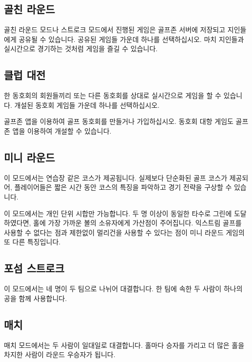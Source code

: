 \documentclass[10pt, openright, language=korean]{hzguide}
\begin{document}
\subsection{골친 라운드}

골친 라운드 모드나 스트로크 모드에서 진행된 게임은 골프존 서버에 저장되고 지인들에게 공유될 수 있습니다.
공유된 게임들 가운데 하나를 선택하십시오.
마치 지인들과 실시간으로 경기하는 것처럼 게임을 즐길 수 있습니다.

\subsection{클럽 대전}

한 동호회의 회원들끼리 또는 다른 동호회를 상대로 실시간으로 게임을 할 수 있습니다.
개설된 동호회 게임들 가운데 하나를 선택하십시오.

\begin{Note}
골프존 앱을 이용하여 골프 동호회를 만들거나 가입하십시오. 동호회 대항 게임도 골프존 앱을 이용하여 개설할 수 있습니다.
\end{Note}

\subsection{미니 라운드}

이 모드에서는 연습장 같은 코스가 제공됩니다. 실제보다 단순화된 골프 코스가 제공되어, 플레이어들은 짧은 시간 동안 코스의 특징을 파악하고 경기 전략을 구상할 수 있습니다.

이 모드에서는 개인 단위 시합만 가능합니다. 두 명 이상이 동일한 타수로 그린에 도달하였다면, 홀에 가장 가까운 볼의 소유자에게 가산점이 주어집니다. 익스트림 골프를 사용할 수 없다는 점과 제한없이 멀리건을 사용할 수 있다는 점이 미니 라운드 게임의 또 다른 특징입니다.

\subsection{포섬 스트로크}

이 모드에서는 네 명이 두 팀으로 나뉘어 대결합니다. 한 팀에 속한 두 사람이 하나의 공을 함께 사용합니다.

\subsection{매치}

매치 모드에서는 두 사람이 일대일로 대결합니다. 홀마다 승자를 가리고 더 많은 홀을 차지한 사람이 라운드 우승자가 됩니다.
\end{document}
